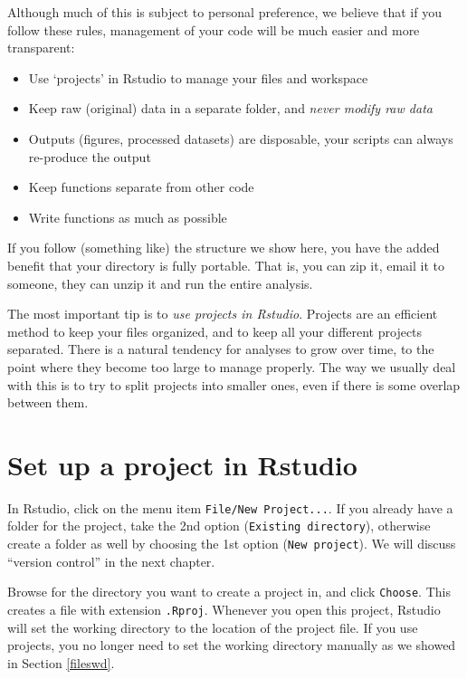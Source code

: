 \documentclass[]{book}
\providecommand{\tightlist}{%
  \setlength{\itemsep}{0pt}\setlength{\parskip}{0pt}}
\begin{document}
Although much of this is subject to personal preference, we believe that if you follow these rules, management of your code will be much easier and more transparent:

\begin{itemize}
\tightlist
\item
  Use `projects' in Rstudio to manage your files and workspace
\item
  Keep raw (original) data in a separate folder, and \emph{never modify raw data}
\item
  Outputs (figures, processed datasets) are disposable, your scripts can always re-produce the output
\item
  Keep functions separate from other code
\item
  Write functions as much as possible
\end{itemize}

If you follow (something like) the structure we show here, you have the added benefit that your directory is fully portable. That is, you can zip it, email it to someone, they can unzip it and run the entire analysis.

The most important tip is to \emph{use projects in Rstudio}. Projects are an efficient method to keep your files organized, and to keep all your different projects separated. There is a natural tendency for analyses to grow over time, to the point where they become too large to manage properly. The way we usually deal with this is to try to split projects into smaller ones, even if there is some overlap between them.

\hypertarget{set-up-a-project-in-rstudio}{%
\section{Set up a project in Rstudio}\label{set-up-a-project-in-rstudio}}

In Rstudio, click on the menu item \texttt{File/New\ Project...}. If you already have a folder for the project, take the 2nd option (\texttt{Existing\ directory}), otherwise create a folder as well by choosing the 1st option (\texttt{New\ project}). We will discuss ``version control'' in the next chapter.

Browse for the directory you want to create a project in, and click \texttt{Choose}. This creates a file with extension \texttt{.Rproj}. Whenever you open this project, Rstudio will set the working directory to the location of the project file. If you use projects, you no longer need to set the working directory manually as we showed in Section \ref{fileswd}.
\end{document}
